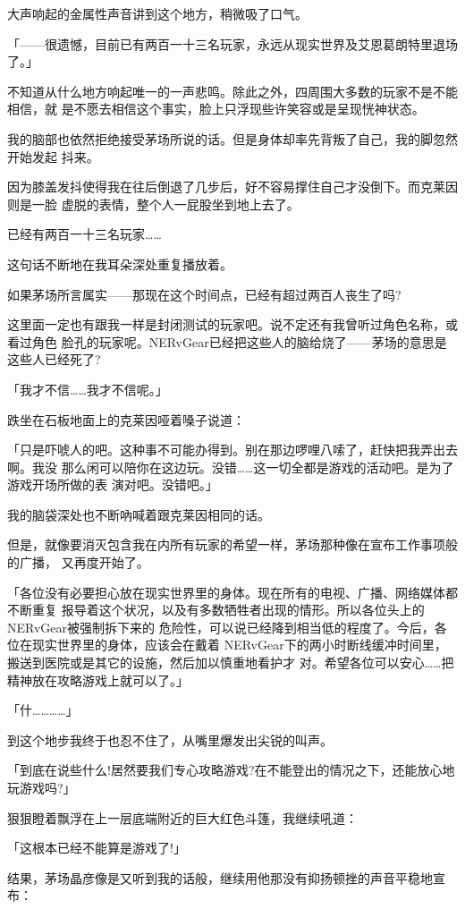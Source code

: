 \documentclass[11pt]{book}
\begin{document}
大声响起的金属性声音讲到这个地方，稍微吸了口气。

「——很遗憾，目前已有两百一十三名玩家，永远从现实世界及艾恩葛朗特里退场了。」

不知道从什么地方响起唯一的一声悲鸣。除此之外，四周围大多数的玩家不是不能相信，就
是不愿去相信这个事实，脸上只浮现些许笑容或是呈现恍神状态。

我的脑部也依然拒绝接受茅场所说的话。但是身体却率先背叛了自己，我的脚忽然开始发起
抖来。

因为膝盖发抖使得我在往后倒退了几步后，好不容易撑住自己才没倒下。而克莱因则是一脸
虚脱的表情，整个人一屁股坐到地上去了。

已经有两百一十三名玩家……

这句话不断地在我耳朵深处重复播放着。

如果茅场所言属实——那现在这个时间点，已经有超过两百人丧生了吗?

这里面一定也有跟我一样是封闭测试的玩家吧。说不定还有我曾听过角色名称，或看过角色
脸孔的玩家呢。NERvGear已经把这些人的脑给烧了——茅场的意思是这些人已经死了?

「我才不信……我才不信呢。」

跌坐在石板地面上的克莱因哑着嗓子说道：

「只是吓唬人的吧。这种事不可能办得到。别在那边啰哩八嗦了，赶快把我弄出去啊。我没
那么闲可以陪你在这边玩。没错……这一切全都是游戏的活动吧。是为了游戏开场所做的表
演对吧。没错吧。」

我的脑袋深处也不断吶喊着跟克莱因相同的话。

但是，就像要消灭包含我在内所有玩家的希望一样，茅场那种像在宣布工作事项般的广播，
又再度开始了。

「各位没有必要担心放在现实世界里的身体。现在所有的电视、广播、网络媒体都不断重复
报导着这个状况，以及有多数牺牲者出现的情形。所以各位头上的NERvGear被强制拆下来的
危险性，可以说已经降到相当低的程度了。今后，各位在现实世界里的身体，应该会在戴着
NERvGear下的两小时断线缓冲时间里，搬送到医院或是其它的设施，然后加以慎重地看护才
对。希望各位可以安心……把精神放在攻略游戏上就可以了。」

「什…………」

到这个地步我终于也忍不住了，从嘴里爆发出尖锐的叫声。

「到底在说些什么!居然要我们专心攻略游戏?在不能登出的情况之下，还能放心地玩游戏吗?」

狠狠瞪着飘浮在上一层底端附近的巨大红色斗篷，我继续吼道：

「这根本已经不能算是游戏了!」

结果，茅场晶彦像是又听到我的话般，继续用他那没有抑扬顿挫的声音平稳地宣布：
\end{document}
